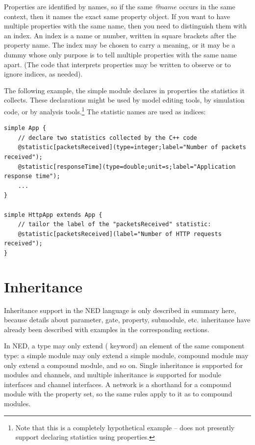 Properties are identified by names, so if the same \textit{@$name$} occurs
in the same context, then it names the exact same property object. If you
want to have multiple properties with the same name, then you need to
distinguish them with an index. An index is a name or number, written in
square brackets after the property name. The index may be chosen to carry
a meaning, or it may be a dummy whose only purpose is to tell multiple
properties with the same name apart. (The code that interprets properties
may be written to observe or to ignore indices, as needed).

The following example, the simple module declares in properties the
statistics it collects. These declarations might be used by model editing
tools, by simulation code, or by analysis tools.\footnote{Note that this is
a completely hypothetical example -- {\opp} does not presently support
declaring statistics using properties.} The statistic names are
used as indices:

\begin{Verbatim}
simple App {
    // declare two statistics collected by the C++ code
    @statistic[packetsReceived](type=integer;label="Number of packets received");
    @statistic[responseTime](type=double;unit=s;label="Application response time");
    ...
}

simple HttpApp extends App {
    // tailor the label of the "packetsReceived" statistic:
    @statistic[packetsReceived](label="Number of HTTP requests received");
}
\end{Verbatim}



\section{Inheritance}
\label{sec:ch-ned-lang:inheritance}

Inheritance support in the NED language is only described in summary here,
because details about parameter, gate, property, submodule, etc.
inheritance have already been described with examples in the corresponding
sections.

In NED, a type may only extend ( keyword) an element of
the same component type: a simple module may only extend a simple module,
compound module may only extend a compound module, and so on. Single
inheritance is supported for modules and channels, and multiple inheritance
is supported for module interfaces and channel interfaces. A network is a
shorthand for a compound module with the  property set, so
the same rules apply to it as to compound modules.

